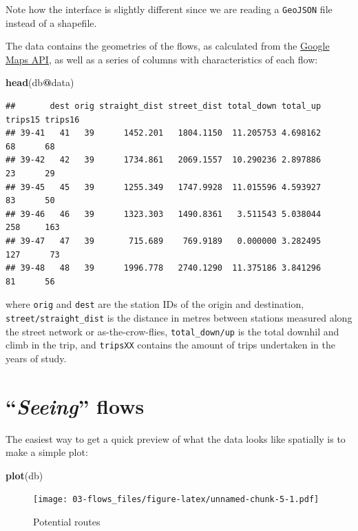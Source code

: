 \documentclass[]{book}
\newenvironment{Shaded}{\begin{snugshade}}{\end{snugshade}}
\newcommand{\KeywordTok}[1]{\textcolor[rgb]{0.13,0.29,0.53}{\textbf{#1}}}
\newcommand{\OperatorTok}[1]{\textcolor[rgb]{0.81,0.36,0.00}{\textbf{#1}}}
\newcommand{\NormalTok}[1]{#1}
\begin{document}
Note how the interface is slightly different since we are reading a
\texttt{GeoJSON} file instead of a shapefile.

The data contains the geometries of the flows, as calculated from the
\href{https://developers.google.com/maps/}{Google Maps API}, as well as
a series of columns with characteristics of each flow:

\begin{Shaded}
\begin{Highlighting}[]
\KeywordTok{head}\NormalTok{(db}\OperatorTok{@}\NormalTok{data)}
\end{Highlighting}
\end{Shaded}

\begin{verbatim}
##       dest orig straight_dist street_dist total_down total_up trips15 trips16
## 39-41   41   39      1452.201   1804.1150  11.205753 4.698162      68      68
## 39-42   42   39      1734.861   2069.1557  10.290236 2.897886      23      29
## 39-45   45   39      1255.349   1747.9928  11.015596 4.593927      83      50
## 39-46   46   39      1323.303   1490.8361   3.511543 5.038044     258     163
## 39-47   47   39       715.689    769.9189   0.000000 3.282495     127      73
## 39-48   48   39      1996.778   2740.1290  11.375186 3.841296      81      56
\end{verbatim}

where \texttt{orig} and \texttt{dest} are the station IDs of the origin
and destination, \texttt{street/straight\_dist} is the distance in
metres between stations measured along the street network or
as-the-crow-flies, \texttt{total\_down/up} is the total downhil and
climb in the trip, and \texttt{tripsXX} contains the amount of trips
undertaken in the years of study.

\section{\texorpdfstring{``\emph{Seeing}''
flows}{Seeing flows}}\label{seeing-flows}

The easiest way to get a quick preview of what the data looks like
spatially is to make a simple plot:

\begin{Shaded}
\begin{Highlighting}[]
\KeywordTok{plot}\NormalTok{(db)}
\end{Highlighting}
\end{Shaded}

\begin{figure}
\centering
\texttt{[image: 03-flows\_files/figure-latex/unnamed-chunk-5-1.pdf]}
\caption{\label{fig:unnamed-chunk-5}Potential routes}
\end{figure}
\end{document}
